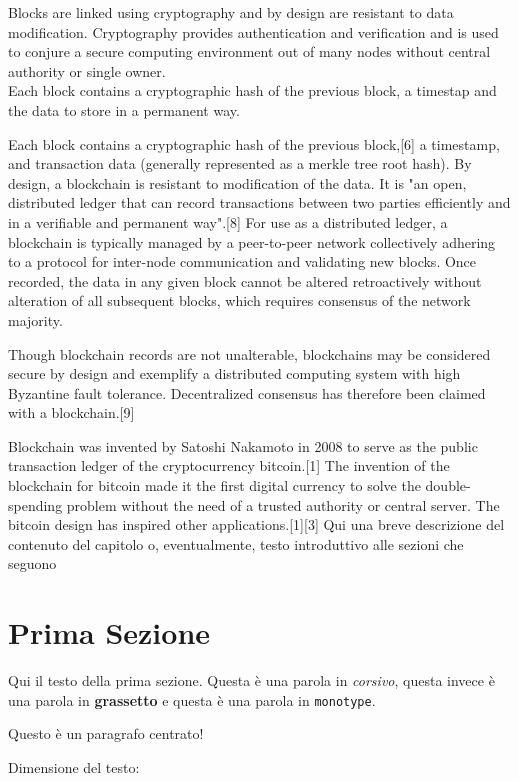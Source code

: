 Blocks are linked using cryptography and by design are resistant to data modification. Cryptography provides authentication and verification and is used to conjure a secure computing environment out of many nodes without central authority or single owner.\\
Each block contains a cryptographic hash of the previous block, a timestap and the data to store in a permanent way.

Each block contains a cryptographic hash of the previous block,[6] a timestamp, and transaction data (generally represented as a merkle tree root hash). By design, a blockchain is resistant to modification of the data. It is "an open, distributed ledger that can record transactions between two parties efficiently and in a verifiable and permanent way".[8] For use as a distributed ledger, a blockchain is typically managed by a peer-to-peer network collectively adhering to a protocol for inter-node communication and validating new blocks. Once recorded, the data in any given block cannot be altered retroactively without alteration of all subsequent blocks, which requires consensus of the network majority.

Though blockchain records are not unalterable, blockchains may be considered secure by design and exemplify a distributed computing system with high Byzantine fault tolerance. Decentralized consensus has therefore been claimed with a blockchain.[9]

Blockchain was invented by Satoshi Nakamoto in 2008 to serve as the public transaction ledger of the cryptocurrency bitcoin.[1] The invention of the blockchain for bitcoin made it the first digital currency to solve the double-spending problem without the need of a trusted authority or central server. The bitcoin design has inspired other applications.[1][3]
Qui una breve descrizione del contenuto del capitolo o, eventualmente, testo introduttivo alle sezioni che seguono

\section{Prima Sezione}
Qui il testo della prima sezione. Questa è  una parola in \textit{corsivo}, questa invece è una parola in \textbf{grassetto} e questa è una parola in \texttt{monotype}.

\begin{center}
Questo è un paragrafo centrato!
\end{center}

Dimensione del testo:\\

